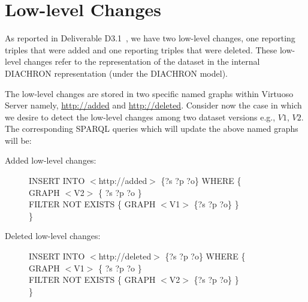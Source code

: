 \section{Low-level Changes}
\label{app:lowlevel}

As reported in Deliverable D3.1~\cite{d3.1}, we have two low-level changes, one reporting triples that were added and one reporting triples that were deleted. These low-level changes refer to the representation of the dataset in the internal DIACHRON representation (under the DIACHRON model).

The low-level changes are stored in two specific named graphs within Virtuoso Server namely, \url{http://added} and \url{http://deleted}. Consider now the case in which we desire to detect the low-level changes among two dataset versions e.g., $V1$, $V2$. The corresponding SPARQL queries which will update the above named graphs will be: 
\begin{description}
\item [Added low-level changes:] 
INSERT INTO $<$http://added$>$ \{?s ?p ?o\} WHERE \{ \\
GRAPH $<$V2$>$ \{ ?s ?p ?o \} \\
FILTER NOT EXISTS \{ GRAPH $<$V1$>$ \{?s ?p ?o\} \}\\
\}

\item [Deleted low-level changes:] 
INSERT INTO $<$http://deleted$>$ \{?s ?p ?o\} WHERE \{ \\
GRAPH $<$V1$>$ \{ ?s ?p ?o \} \\
FILTER NOT EXISTS \{ GRAPH $<$V2$>$ \{?s ?p ?o\} \}\\
\}
\end{description}

